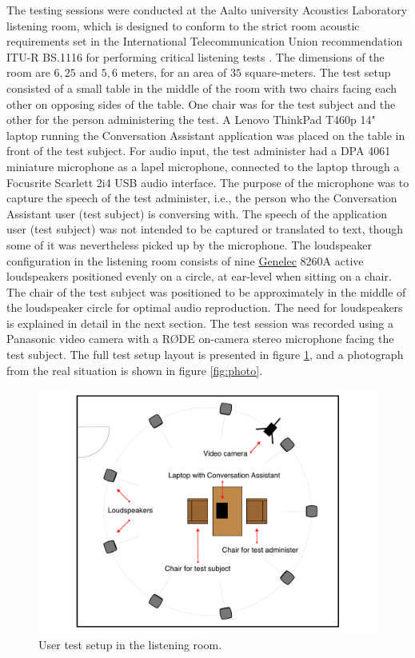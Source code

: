 \documentclass[english, 12pt, a4paper, pdftex, elec, utf8]{aaltothesis}
\begin{document}
The testing sessions were conducted at the Aalto university Acoustics Laboratory listening room, which is designed to conform to the strict room acoustic requirements set in the International Telecommunication Union recommendation ITU-R BS.1116 for performing critical listening tests \cite{ITU1116, jarvinen1999kuunteluhuone}. The dimensions of the room are $6,25$ and $5,6$ meters, for an area of $35$ square-meters. The test setup consisted of a small table in the middle of the room with two chairs facing each other on opposing sides of the table. One chair was for the test subject and the other for the person administering the test. A Lenovo ThinkPad T460p 14" laptop running the Conversation Assistant application was placed on the table in front of the test subject. For audio input, the test administer had a DPA 4061 miniature microphone as a lapel microphone, connected to the laptop through a Focusrite Scarlett 2i4 USB audio interface. The purpose of the microphone was to capture the speech of the test administer, i.e., the person who the Conversation Assistant user (test subject) is conversing with. The speech of the application user (test subject) was not intended to be captured or translated to text, though some of it was nevertheless picked up by the microphone. The loudspeaker configuration in the listening room consists of nine \href{https://www.genelec.com/}{Genelec} 8260A active loudspeakers positioned evenly on a circle, at ear-level when sitting on a chair. The chair of the test subject was positioned to be approximately in the middle of the loudspeaker circle for optimal audio reproduction. The need for loudspeakers is explained in detail in the next section. The test session was recorded using a Panasonic video camera with a RØDE on-camera stereo microphone facing the test subject. The full test setup layout is presented in figure \ref{fig:setup}, and a photograph from the real situation is shown in figure \ref{fig:photo}. \\
\begin{figure}[h]
	\centering
	\includegraphics[trim={2cm 0cm 2cm 0cm}, clip, width=\textwidth]{setup2.pdf}
	\caption{User test setup in the listening room.}
	\label{fig:setup} 
\end{figure}
\end{document}
